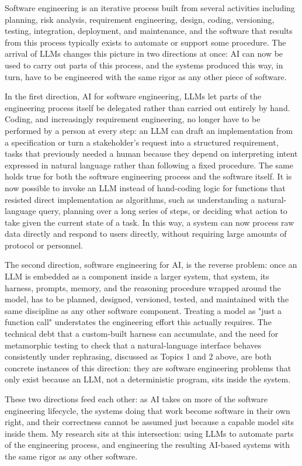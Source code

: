 \documentclass[11pt]{article}
\begin{document}
Software engineering is an iterative process built from several activities including planning, risk analysis, requirement engineering, design, coding, versioning, testing, integration, deployment, and maintenance, and the software that results from this process typically exists to automate or support some procedure. The arrival of LLMs changes this picture in two directions at once: AI can now be used to carry out parts of this process, and the systems produced this way, in turn, have to be engineered with the same rigor as any other piece of software.

In the first direction, AI for software engineering, LLMs let parts of the engineering process itself be delegated rather than carried out entirely by hand. Coding, and increasingly requirement engineering, no longer have to be performed by a person at every step: an LLM can draft an implementation from a specification or turn a stakeholder's request into a structured requirement, tasks that previously needed a human because they depend on interpreting intent expressed in natural language rather than following a fixed procedure. The same holds true for both the software engineering process and the software itself. It is now possible to invoke an LLM instead of hand-coding logic for functions that resisted direct implementation as algorithms, such as understanding a natural-language query, planning over a long series of steps, or deciding what action to take given the current state of a task. In this way, a system can now process raw data directly and respond to users directly, without requiring large amounts of protocol or personnel.

The second direction, software engineering for AI, is the reverse problem: once an LLM is embedded as a component inside a larger system, that system, its harness, prompts, memory, and the reasoning procedure wrapped around the model, has to be planned, designed, versioned, tested, and maintained with the same discipline as any other software component. Treating a model as "just a function call" understates the engineering effort this actually requires. The technical debt that a custom-built harness can accumulate, and the need for metamorphic testing to check that a natural-language interface behaves consistently under rephrasing, discussed as Topics 1 and 2 above, are both concrete instances of this direction: they are software engineering problems that only exist because an LLM, not a deterministic program, sits inside the system.

These two directions feed each other: as AI takes on more of the software engineering lifecycle, the systems doing that work become software in their own right, and their correctness cannot be assumed just because a capable model sits inside them. My research sits at this intersection: using LLMs to automate parts of the engineering process, and engineering the resulting AI-based systems with the same rigor as any other software.
\end{document}
